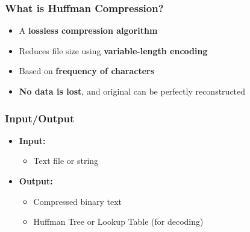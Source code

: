 \documentclass[10pt,aspectratio=43]{beamer}
\begin{document}
\begin{frame}
    \frametitle{\textcolor{myMaroon}{What is Huffman Compression?}}
    \begin{itemize}
        \item A \textbf{lossless compression algorithm}
        
        \vspace{0.4cm}
        \item Reduces file size using \textbf{variable-length encoding}
        
        \vspace{0.4cm}
        \item Based on \textbf{frequency of characters}
        
        \vspace{0.4cm}
        \item \textbf{No data is lost}, and original can be perfectly reconstructed
    \end{itemize}

\end{frame}




\begin{frame}
    \frametitle{\textcolor{myMaroon}{Input/Output}}
    \begin{itemize}
        \item \textcolor{myMaroon}{\textbf{Input:}} 
        \begin{itemize}
            \item Text file or string
        \end{itemize}
        
        \vspace{0.5cm}
        \item \textcolor{myMaroon}{\textbf{Output:}} 
        \begin{itemize}
            \item Compressed binary text
            \item Huffman Tree or Lookup Table (for decoding)
        \end{itemize}
    \end{itemize}

\end{frame}
\end{document}
